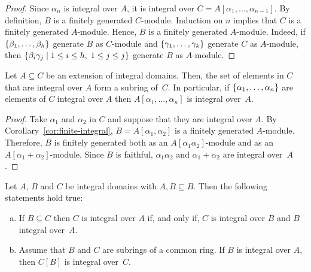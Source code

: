 \begin{proof}
    Since $\alpha_n$ is integral over $A$, it is integral over $C=A[\alpha_1,\dots,\alpha_{n-1}]$. By definition, $B$ is a finitely generated $C$-module. Induction on $n$ implies that $C$ is a finitely generated $A$-module. Hence, $B$ is a finitely generated $A$-module. Indeed, if $\{\beta_1,\dots,\beta_h\}$ generate $B$ as $C$-module and $\{\gamma_1,\dots,\gamma_k\}$ generate $C$ as $A$-module, then $\{\beta_i\gamma_j\mid1\le i\le h,\;1\le j\le j\}$ generate $B$ as $A$-module.
    
\end{proof}

\begin{cor}\label{cor:integral-ring}
    Let\/ $A\subseteq C$ be an extension of integral domains. Then, the set of elements in\/ $C$ that are integral over\/ $A$ form a subring of\/~$C$. In particular, if\/ $\{\alpha_1,\dots,\alpha_n\}$ are elements of\/ $C$ integral over\/ $A$ then\/ $A[\alpha_1,\dots,\alpha_n]$ is integral over\/~$A$.
\end{cor}

\begin{proof}
    Take $\alpha_1$ and $\alpha_2$ in $C$ and suppose that they are integral over $A$. By Corollary~\ref{cor:finite-integral}, $B=A[\alpha_1,\alpha_2]$ is a finitely generated $A$-module. Therefore, $B$ is finitely generated both as an $A[\alpha_1\alpha_2]$-module and as an $A[\alpha_1+\alpha_2]$-module. Since $B$ is faithful, $\alpha_1\alpha_2$ and $\alpha_1+\alpha_2$ are integral over~$A$.
    
\end{proof}

\begin{cor}
    Let\/ $A$, $B$ and\/ $C$ be integral domains with\/ $A, B\subseteq B$. Then the following statements hold true:
    \begin{enumerate}[a), font=\upshape]
        \item If\/ $B\subseteq C$ then\/ $C$ is integral over\/ $A$ if, and only if, $C$ is integral over\/ $B$ and\/ $B$ integral over\/~$A$.

        \item Assume that\/ $B$ and\/ $C$ are subrings of a common ring. If\/ $B$ is integral over\/ $A$, then\/ $C[B]$ is integral over\/~$C$.
    \end{enumerate}
\end{cor}

